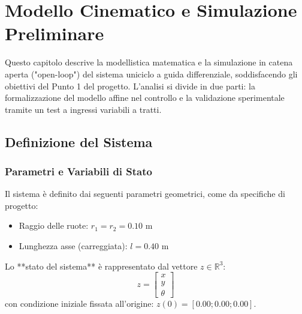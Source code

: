 \chapter{Modello Cinematico e Simulazione Preliminare} \label{chap:modello}

Questo capitolo descrive la modellistica matematica e la simulazione in catena aperta ("open-loop") del sistema uniciclo a guida differenziale, soddisfacendo gli obiettivi del Punto 1 del progetto. L'analisi si divide in due parti: la formalizzazione del modello affine nel controllo e la validazione sperimentale tramite un test a ingressi variabili a tratti.

\section{Definizione del Sistema}

\subsection{Parametri e Variabili di Stato}
Il sistema è definito dai seguenti parametri geometrici, come da specifiche di progetto:
\begin{itemize}
    \item Raggio delle ruote: \( r_1 = r_2 = 0.10 \) m
    \item Lunghezza asse (carreggiata): \( l = 0.40 \) m
\end{itemize}

Lo **stato del sistema** è rappresentato dal vettore \( z \in \mathbb{R}^3 \):
\begin{equation}
    z = \begin{bmatrix} x \\ y \\ \theta \end{bmatrix}
\end{equation}
con condizione iniziale fissata all'origine: \( z(0) = [0.00; 0.00; 0.00] \).

